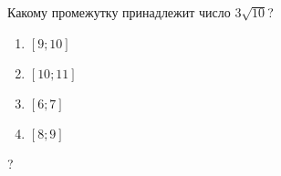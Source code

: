 \begin{ex}
	Какому промежутку принадлежит число $3\sqrt{10}$?
	
	\selectanswer
	\begin{multicols}{4}
		\begin{enumerate}[label=\arabic*)]
			\item $[9;10]$
			\item $[10;11]$
			\item $[6;7]$
			\item $[8;9]$
		\end{enumerate}
	\end{multicols}
	\begin{answer}
		?
	\end{answer}
\end{ex}